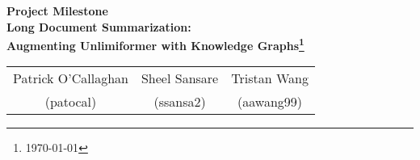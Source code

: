 \begin{center}
\large
\textbf{Project Milestone}\\
\Large
\textbf{Long Document Summarization:}\\
\textbf{Augmenting Unlimiformer with Knowledge Graphs\footnote{\today}}\\
\begin{table}[h]
    \centering
    \begin{tabular}{ccc}
        Patrick O'Callaghan&  Sheel Sansare& Tristan Wang\\
         (patocal)& (ssansa2)  & (aawang99)\\
    \end{tabular}
    \label{tab:my_label}
\end{table}
\end{center}
